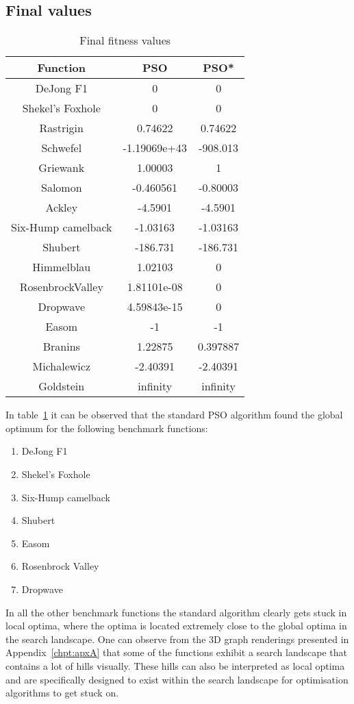 \subsection{Final values}
\begin{table}[h]
\label{tbl:fitnessValues}
\begin{center}
	\begin{tabular}{| c | c | c |}
	\hline
	Function & PSO & PSO*\\  \hline
	DeJong F1 & 0 & 0 \\ \hline
	Shekel's Foxhole & 0 & 0 \\ \hline
	Rastrigin & 0.74622  & 0.74622\\ \hline
	Schwefel & -1.19069e+43  & -908.013\\ \hline
	Griewank & 1.00003 & 1 \\ \hline
	Salomon & -0.460561 & -0.80003 \\ \hline
	Ackley & -4.5901 & -4.5901 \\ \hline
	Six-Hump camelback & -1.03163 & -1.03163 \\ \hline
	Shubert & -186.731 & -186.731 \\ \hline
	Himmelblau & 1.02103 & 0 \\ \hline
	RosenbrockValley & 1.81101e-08 & 0 \\ \hline
	Dropwave & 4.59843e-15 & 0 \\ \hline
	Easom & -1 & -1 \\ \hline
	Branins & 1.22875 & 0.397887 \\ \hline
	Michalewicz & -2.40391 & -2.40391 \\ \hline
	Goldstein & infinity  & infinity\\ \hline
	\end{tabular}
\end{center}
\caption{Final fitness values}
\end{table}
In table~\ref{tbl:fitnessValues} it can be observed that the standard PSO algorithm found the global optimum for the following benchmark functions:
\begin{enumerate}
\item DeJong F1 
\item Shekel's Foxhole
\item Six-Hump camelback
\item Shubert
\item Easom
\item Rosenbrock Valley
\item Dropwave
\end{enumerate}
In all the other benchmark functions the standard algorithm clearly gets stuck in local optima, where the optima is located extremely close to the global optima in the search landscape. One can observe from the 3D graph renderings presented in Appendix~\ref{chpt:apxA} that some of the functions exhibit a search landscape that contains a lot of hills visually. These hills can also be interpreted as local optima and are specifically designed to exist within the search landscape for optimisation algorithms to get stuck on.

